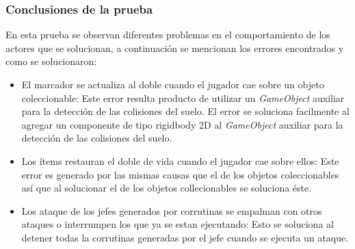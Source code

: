 \subsubsection{Conclusiones de la prueba}
En esta prueba se observan diferentes problemas en el comportamiento de los actores 
que se solucionan, a continuación se mencionan los errores encontrados y como se 
solucionaron:
        \begin{itemize}
                \item El marcador se actualiza al doble cuando el jugador cae 
                sobre un objeto coleccionable: Este error resulta producto de 
                utilizar un \textit{GameObject} auxiliar para la detección de las 
                colisiones del suelo. El error se soluciona facilmente al agregar 
                un componente de tipo rigidbody 2D al \textit{GameObject} auxiliar 
                para la detección de las colisiones del suelo.
                \item Los ítems restauran el doble de vida cuando el jugador cae 
                sobre ellos: Este error es generado por las mismas causas que el 
                de los objetos coleccionables así que al solucionar el de los 
                objetos collecionables se soluciona éste.
                \item Los ataque de los jefes generados por corrutinas se 
                empalman con otros ataques o interrumpen los que ya se estan 
                ejecutando: Esto se soluciona al detener todas la corrutinas generadas 
                por el jefe cuando se ejecuta un ataque.
        \end{itemize}
